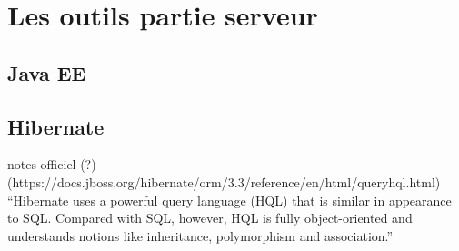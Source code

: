 \chapter{Les outils partie serveur}


\section{Java EE}


\section{Hibernate}
notes officiel (?)
(https://docs.jboss.org/hibernate/orm/3.3/reference/en/html/queryhql.html)\\

``Hibernate uses a powerful query language (HQL) that is similar in appearance to SQL. Compared with SQL, however, HQL is fully object-oriented and understands notions like inheritance, polymorphism and association.''
